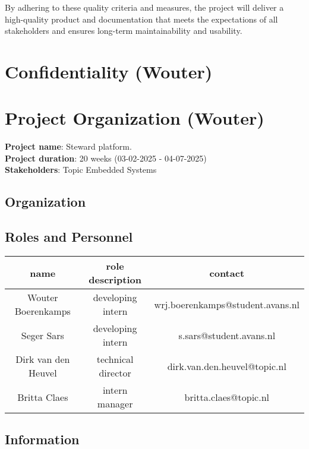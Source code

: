 \documentclass{article}
\begin{document}
By adhering to these quality criteria and measures, the project will deliver a high-quality product and documentation that meets the expectations of all stakeholders and ensures long-term maintainability and usability.

\newpage

\section{Confidentiality (Wouter)}


\newpage

\section{Project Organization (Wouter)}
\textbf{Project name}: Steward platform.\\
\textbf{Project duration}: 20 weeks (03-02-2025 - 04-07-2025)\\
\textbf{Stakeholders}: Topic Embedded Systems

\subsection{Organization}
\subsection{Roles and Personnel}
\begin{center}\label{involved-party-table} 
    \begin{tabular}{|c|c|c|} 
        \hline
        name & role description & contact \\ 
        \hline 
        Wouter Boerenkamps & developing intern & wrj.boerenkamps@student.avans.nl \\ 
        \hline 
        Seger Sars & developing intern & s.sars@student.avans.nl \\  
        \hline 
        Dirk van den Heuvel &
        technical director & dirk.van.den.heuvel@topic.nl \\ 
        \hline 
        Britta Claes & intern manager & britta.claes@topic.nl \\ 
        \hline 
    \end{tabular}
\end{center}
\subsection{Information}


\newpage
\end{document}
